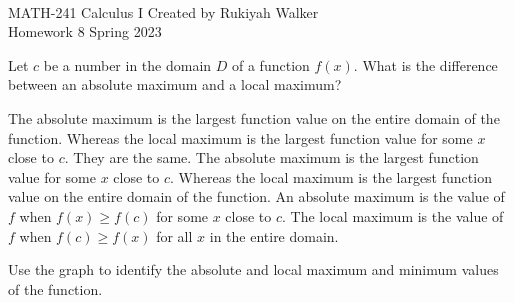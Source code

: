\documentclass[addpoints, 12pt]{exam}%
\begin{document}
\noindent \hrulefill \\
	MATH-241 Calculus I \hfill Created by Rukiyah Walker\\
	Homework 8 \hfill Spring 2023\\ \vspace*{-1cm}
 
	\noindent\hrulefill


\begin{questions}

\vspace*{0.5cm}

\question[1]

Let $c$ be a number in the domain $D$ of a function $f(x)$. What is the difference between an absolute maximum and a local maximum?

\begin{choices}
\CorrectChoice The absolute maximum is the largest function value on the entire domain of the function. Whereas the local maximum is the largest function value for some $x$ close to $c$.
\choice They are the same.
\choice The absolute maximum is the largest function value for some $x$ close to $c$. Whereas the local maximum is the largest function value on the entire domain of the function.
\choice An absolute maximum is the value of $f$ when $f(x) \geq f(c)$ for some $x$ close to $c$. The local maximum is the value of $f$ when $f(c) \geq f(x)$ for all $x$ in the entire domain.
\end{choices}

\question[1]


Use the graph to identify the absolute and local maximum and minimum values of the function.


\end{questions}
\end{document}
